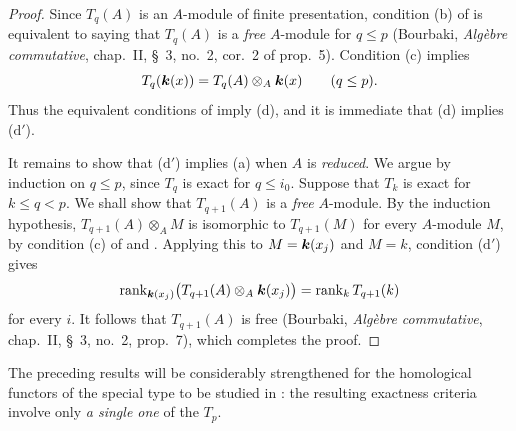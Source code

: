 \begin{proof}
Since $T_q(A)$ is an $A$-module of finite presentation,
condition (b) of  is equivalent to saying that
$T_q(A)$ is a \emph{free} $A$-module for $q\leq p$ (Bourbaki,
\emph{Alg\`ebre commutative}, chap.~II, \S~3, no.~2, cor.~2
of prop.~5).  Condition (c) implies
\[
  T_q(\boldsymbol{k}(x))
  =
  T_q(A)\otimes_A\boldsymbol{k}(x)
  \qquad(q\leq p).
\]
Thus the equivalent conditions of  imply (d),
and it is immediate that (d) implies ($\mathrm{d}'$).

It remains to show that ($\mathrm{d}'$) implies (a) when $A$ is
\emph{reduced}.  We argue by induction on $q\leq p$, since $T_q$ is
exact for $q\leq i_0$.  Suppose that $T_k$ is exact for
$k\leq q<p$.  We shall show that $T_{q+1}(A)$ is a \emph{free}
$A$-module.  By the induction hypothesis,
$T_{q+1}(A)\otimes_A M$ is isomorphic to $T_{q+1}(M)$
for every $A$-module $M$, by condition (c) of
 and .  Applying this to
$M=\boldsymbol{k}(x_j)$ and $M=k$, condition ($\mathrm{d}'$) gives
\[
  \operatorname{rank}_{\boldsymbol{k}(x_j)}
  \bigl(T_{q+1}(A)\otimes_A\boldsymbol{k}(x_j)\bigr)
  =
  \operatorname{rank}_k T_{q+1}(k)
\]
for every $i$.  It follows that
$T_{q+1}(A)$ is free (Bourbaki,
\emph{Alg\`ebre commutative}, chap.~II, \S~3, no.~2, prop.~7),
which completes the proof.
\end{proof}

The preceding results will be considerably strengthened for
the homological functors of the special type to be studied in
: the resulting exactness criteria involve only
\emph{a single one} of the $T_p$.
